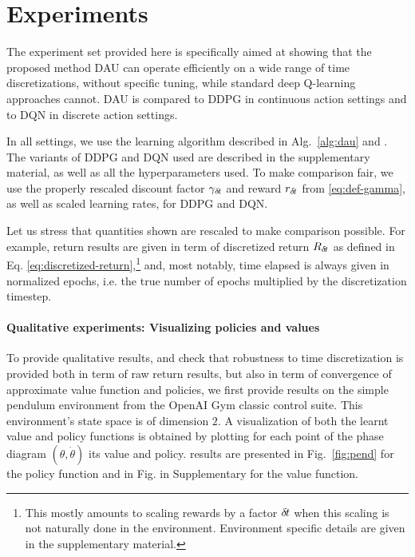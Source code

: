 \section{Experiments}
\label{sec:exp}

The experiment set provided here is specifically aimed at showing that
the proposed method DAU can operate efficiently on a wide range of time
discretizations, without specific tuning, while standard deep Q-learning
approaches cannot. DAU is compared to DDPG in continuous action settings and to DQN in
discrete action settings. 

In all settings, we use the learning algorithm described in
Alg.~\ref{alg:dau} and . The variants of DDPG and DQN
used are described in the supplementary material, as well as all the hyperparameters
used. To make comparison fair, we use the properly rescaled discount
factor $\gamma_{\delta\hspace{-.1em}t}$ and reward $r_{\delta\hspace{-.1em}t}$ from \eqref{eq:def-gamma}, as well as scaled learning rates, for DDPG and DQN.

Let us stress that quantities shown are rescaled to make comparison possible. For example,
return results are given in term of discretized return $R_{\delta\hspace{-.1em}t}$ as defined in Eq. \eqref{eq:discretized-return},\footnote{This mostly amounts to scaling rewards
by a factor ${\delta\hspace{-.1em}t}$ when this scaling is not naturally done in the environment. Environment specific
details are given in the supplementary material.} and, most notably, time elapsed is always given in
normalized epochs, i.e. the true number of epochs multiplied by the discretization timestep.


\paragraph{Qualitative experiments: Visualizing policies and values}
To provide qualitative results, and check that robustness to time
discretization is provided both in term of raw return results, but also in term
of convergence of approximate value function and policies, we first provide results on the simple pendulum environment
from the OpenAI Gym classic control suite.  This environment's state space is of dimension $2$. A visualization of both the learnt value and policy functions is obtained by plotting for each point of the phase diagram $(\theta, \dot{\theta})$ its value and policy. results are presented in
Fig.~\ref{fig:pend} for the policy function and in Fig. in Supplementary  for the value function.

